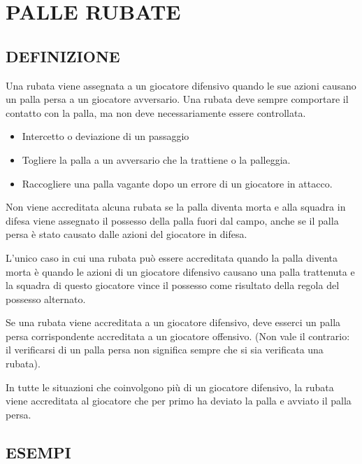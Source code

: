 \section{PALLE RUBATE}
\sectionline

\subsection{DEFINIZIONE}
\subsectionline

Una rubata viene assegnata a un giocatore difensivo quando le sue azioni causano un palla persa a un giocatore avversario. Una rubata deve sempre comportare il contatto con la palla, ma non deve necessariamente essere controllata.

\begin{itemize}
    \item Intercetto o deviazione di un passaggio
    \item Togliere la palla a un avversario che la trattiene o la palleggia.
    \item Raccogliere una palla vagante dopo un errore di un giocatore in attacco.
\end{itemize}

Non viene accreditata alcuna rubata se la palla diventa morta e alla squadra in difesa viene assegnato il possesso della palla fuori dal campo, anche se il palla persa è stato causato dalle azioni del giocatore in difesa.

L'unico caso in cui una rubata può essere accreditata quando la palla diventa morta è quando le azioni di un giocatore difensivo causano una palla trattenuta e la squadra di questo giocatore vince il possesso come risultato della regola del possesso alternato.

Se una rubata viene accreditata a un giocatore difensivo, deve esserci un palla persa corrispondente accreditata a un giocatore offensivo. (Non vale il contrario: il verificarsi di un palla persa non significa sempre che si sia verificata una rubata).

In tutte le situazioni che coinvolgono più di un giocatore difensivo, la rubata viene accreditata al giocatore che per primo ha deviato la palla e avviato il palla persa.

\subsection{ESEMPI}
\subsectionline


